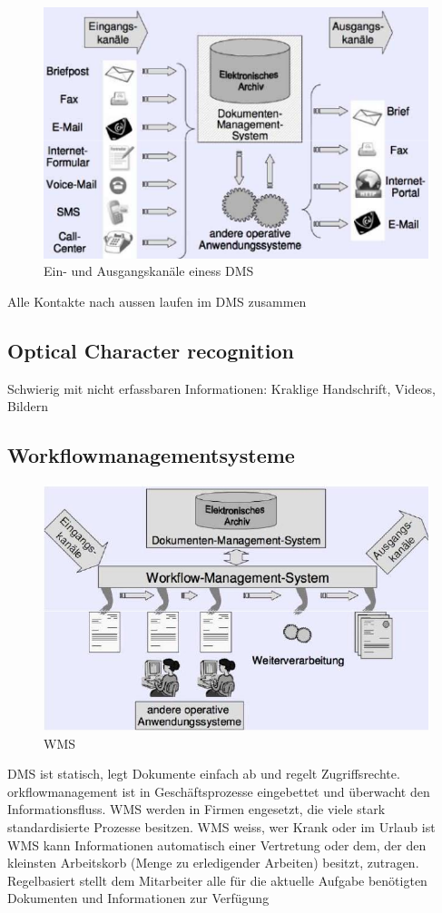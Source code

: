 \documentclass[ngerman,a4paper,12pt]{scrreprt}
\begin{document}
\begin{figure}[H]
	\centering
	\includegraphics[scale=1.00]{img/V4.1.jpg}
	\caption{Ein- und Ausgangskanäle einess DMS}
	\label{}
\end{figure}
Alle Kontakte nach aussen laufen im DMS zusammen

\subsection{Optical Character recognition}
Schwierig mit nicht erfassbaren Informationen: Kraklige Handschrift, Videos, Bildern


\subsection{Workflowmanagementsysteme}
\begin{figure}[H]
	\centering
	\includegraphics[width=\textwidth]{img/V5.1.jpg}
	\caption{WMS}
	\label{}
\end{figure}
\ul
	\li DMS ist statisch, legt Dokumente einfach ab und regelt Zugriffsrechte.
	\li orkflowmanagement ist in Geschäftsprozesse eingebettet und überwacht den Informationsfluss.
	\li WMS werden in Firmen engesetzt, die viele stark standardisierte Prozesse besitzen.
	\li WMS weiss, wer Krank oder im Urlaub ist
	\li WMS kann Informationen automatisch einer Vertretung oder dem, der den kleinsten Arbeitskorb (Menge zu erledigender Arbeiten) besitzt, zutragen.
	\li Regelbasiert
	\li stellt dem Mitarbeiter alle für die aktuelle Aufgabe benötigten Dokumenten und Informationen zur Verfügung
\ulE
\end{document}
